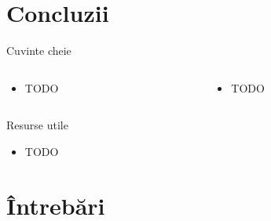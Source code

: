 \documentclass{beamer}
\begin{document}
\section{Concluzii}

\begin{frame}{Cuvinte cheie}
  \begin{columns}
    \begin{column}[l]{0.5\textwidth}
      \begin{itemize}
        \item TODO
      \end{itemize}
    \end{column}
    \begin{column}[l]{0.5\textwidth}
      \begin{itemize}
        \item TODO
      \end{itemize}
    \end{column}
  \end{columns}
\end{frame}

\begin{frame}{Resurse utile}
  \begin{itemize}
    \small
    \item TODO
  \end{itemize}
\end{frame}

\section{Întrebări}
\end{document}
